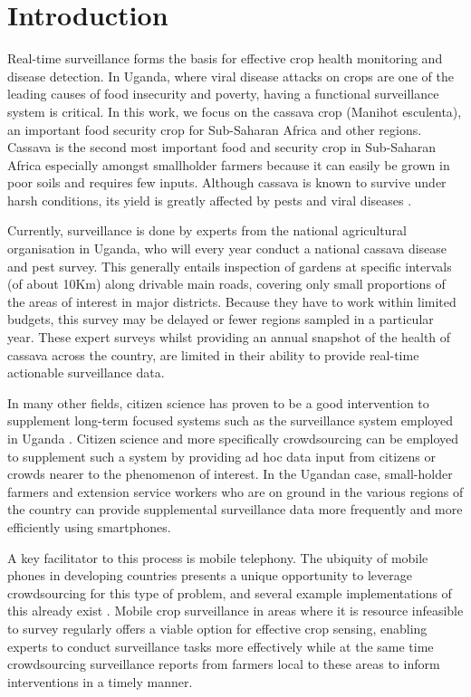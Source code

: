\documentclass[letterpaper]{article} %
\begin{document}
\section{Introduction}
Real-time surveillance forms the basis for effective crop health monitoring and disease detection. In Uganda, where viral disease attacks on crops are one of the leading causes of food insecurity and poverty, having a functional surveillance system is critical. In this work, we focus on the cassava crop (Manihot esculenta), an important food security crop for Sub-Saharan Africa and other regions. Cassava is the second most important food and security crop in Sub-Saharan Africa especially amongst smallholder farmers because it can easily be grown in poor soils and requires few inputs. Although cassava is known to survive under harsh conditions, its yield is greatly affected by pests and viral diseases \cite{ephraim2015,otim2000current}.


Currently, surveillance is done by experts from the national agricultural organisation in Uganda, who will every year conduct a national cassava disease and pest survey. This generally entails inspection of gardens at specific intervals (of about 10Km) along drivable main roads, covering only small proportions of the areas of interest in major districts. Because they have to work within limited budgets, this survey may be delayed or fewer regions sampled in a particular year. These expert surveys whilst providing an annual snapshot of the health of cassava across the country, are limited in their ability to provide real-time actionable surveillance data.

In many other fields, citizen science has proven to be a good intervention to supplement long-term focused systems such as the surveillance system employed in Uganda \cite{silvertown2009new}. Citizen science and more specifically crowdsourcing can be employed to supplement such a system by providing ad hoc data input from citizens or crowds nearer to the phenomenon of interest. In the Ugandan case, small-holder farmers and extension service workers who are on ground in the various regions of the country can provide supplemental surveillance data more frequently and more efficiently using smartphones.

A key facilitator to this process is mobile telephony. The ubiquity of mobile phones in developing countries presents a unique opportunity to leverage crowdsourcing for this type of problem, and several example implementations of this already exist \cite{chatzimilioudis2012crowdsourcing,agapie2015crowdsourcing}. Mobile crop surveillance in areas where it is resource infeasible to survey regularly offers a viable option for effective crop sensing, enabling experts to conduct surveillance tasks more effectively while at the same time crowdsourcing surveillance reports from farmers local to these areas to inform interventions in a timely manner.
\end{document}
